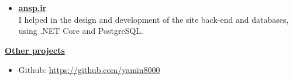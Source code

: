 \begin{multicols}{2}
\begin{description}
\begin {itemize}
            I helped in design and implementation of various pages on this website using Laravel, Blade, Bootstrap, and Javascript.
            My work included but not limited to implementing various controllers/services using PHP, designing front-end pages using Blade/HTML/CSS/JavaScript and bootstrap.
            \item \href{https://ansp.ir}{\textbf{ansp.ir}}\\
            I helped in the design and development of the site back-end and databases,
            using .NET Core and PostgreSQL\@.
        \end{itemize}
        \item \href{https://github.com/yamin8000}{\textbf{Other projects}}
        \begin{itemize}
            \item Github: \href{https://github.com/yamin8000}{https://github.com/yamin8000}
        \end{itemize}
    \end{description}
\end{multicols}